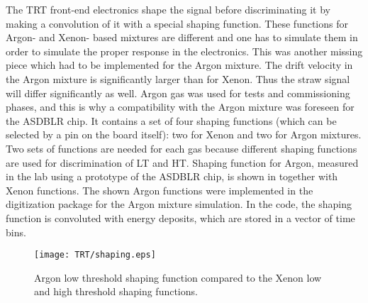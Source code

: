 
The TRT front-end electronics shape the signal before discriminating it by making a convolution of it with a special shaping function. These functions for Argon- and Xenon- based mixtures are different and one has to simulate them in order to simulate the proper response in the electronics. 
This was another missing piece which had to be implemented for the Argon mixture. 
The drift velocity in the Argon mixture is significantly larger than for Xenon. Thus the straw signal will differ significantly as well.
Argon gas was used for tests and commissioning phases, and this is why a compatibility with the Argon mixture was foreseen for the ASDBLR chip. It contains a set of four shaping functions (which can be selected
by a pin on the board itself): two for Xenon and two for Argon mixtures. Two sets of functions are needed for each gas because different shaping functions are used for discrimination of LT and HT. Shaping function for Argon, measured in the lab using a prototype of the ASDBLR chip, is shown in  together with Xenon functions. The shown Argon functions were implemented in the digitization package for the Argon mixture simulation. In the code, the shaping function is convoluted with energy deposits, which are stored in a vector of time bins.

\begin{figure}[h]
\begin{center}
 \texttt{[image: TRT/shaping.eps]}
\caption{Argon low threshold shaping function compared to the Xenon low and high threshold shaping functions.}
\label{fig:shaping}
\end{center}
\end{figure}


